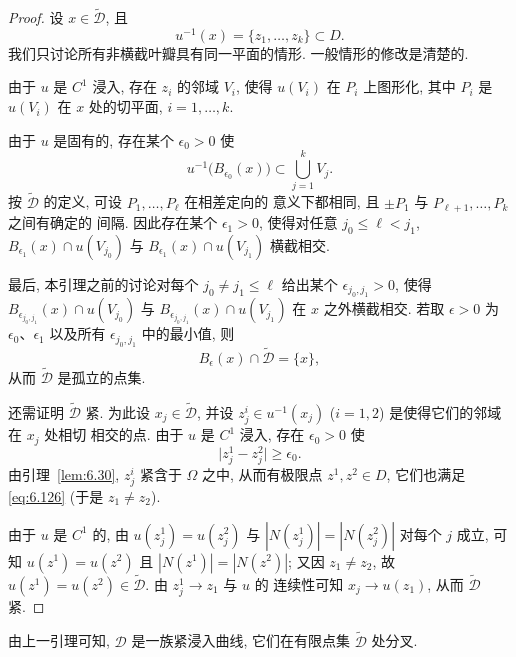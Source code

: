 \begin{proof}
设 $x\in\tilde{\mathcal{D}}$, 且
\begin{equation}
u^{-1}(x)=\{z_1,\ldots,z_k\}\subset D.
\label{eq:6.123}
\end{equation}
我们只讨论所有非横截叶瓣具有同一平面的情形. 一般情形的修改是清楚的.

由于 $u$ 是 $C^1$ 浸入, 存在 $z_i$ 的邻域 $V_i$, 使得 $u(V_i)$ 在
$P_i$ 上图形化, 其中 $P_i$ 是 $u(V_i)$ 在 $x$ 处的切平面, $i=1,\ldots,k$.

由于 $u$ 是固有的, 存在某个 $\epsilon_0>0$ 使
\begin{equation}
u^{-1}\bigl(B_{\epsilon_0}(x)\bigr)\subset\bigcup_{j=1}^{k}V_j.
\label{eq:6.124}
\end{equation}
按 $\tilde{\mathcal{D}}$ 的定义, 可设 $P_1,\ldots,P_\ell$ 在相差定向的
意义下都相同, 且 $\pm P_1$ 与 $P_{\ell+1},\ldots,P_k$ 之间有确定的
间隔. 因此存在某个 $\epsilon_1>0$, 使得对任意 $j_0\leq\ell<j_1$,
$B_{\epsilon_1}(x)\cap u(V_{j_0})$ 与 $B_{\epsilon_1}(x)\cap u(V_{j_1})$
横截相交.

最后, 本引理之前的讨论对每个 $j_0\neq j_1\leq\ell$ 给出某个
$\epsilon_{j_0,j_1}>0$, 使得 $B_{\epsilon_{j_0,j_1}}(x)\cap u(V_{j_0})$
与 $B_{\epsilon_{j_0,j_1}}(x)\cap u(V_{j_1})$ 在 $x$ 之外横截相交. 若取
$\epsilon>0$ 为 $\epsilon_0$、$\epsilon_1$ 以及所有
$\epsilon_{j_0,j_1}$ 中的最小值, 则
\begin{equation}
B_\epsilon(x)\cap\tilde{\mathcal{D}}=\{x\},
\label{eq:6.125}
\end{equation}
从而 $\tilde{\mathcal{D}}$ 是孤立的点集.

还需证明 $\tilde{\mathcal{D}}$ 紧. 为此设 $x_j\in\tilde{\mathcal{D}}$,
并设 $z_j^i\in u^{-1}(x_j)$ ($i=1,2$) 是使得它们的邻域在 $x_j$ 处相切
相交的点. 由于 $u$ 是 $C^1$ 浸入, 存在 $\epsilon_0>0$ 使
\begin{equation}
\bigl|z_j^1-z_j^2\bigr|\geq\epsilon_0.
\label{eq:6.126}
\end{equation}
由引理~\ref{lem:6.30}, $z_j^i$ 紧含于 $\Omega$ 之中, 从而有极限点
$z^1,z^2\in D$, 它们也满足 \eqref{eq:6.126} (于是 $z_1\neq z_2$).

由于 $u$ 是 $C^1$ 的, 由 $u(z_j^1)=u(z_j^2)$ 与
$|N(z_j^1)|=|N(z_j^2)|$ 对每个 $j$ 成立, 可知 $u(z^1)=u(z^2)$ 且
$|N(z^1)|=|N(z^2)|$; 又因 $z_1\neq z_2$, 故
$u(z^1)=u(z^2)\in\tilde{\mathcal{D}}$. 由 $z_j^1\to z_1$ 与 $u$ 的
连续性可知 $x_j\to u(z_1)$, 从而 $\tilde{\mathcal{D}}$ 紧.
\end{proof}

由上一引理可知, $\mathcal{D}$ 是一族紧浸入曲线, 它们在有限点集
$\tilde{\mathcal{D}}$ 处分叉.

